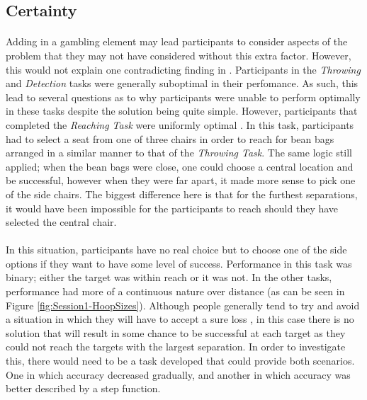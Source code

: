 \documentclass[12pt]{article}
\begin{document}
\subsection*{Certainty}
\paragraph{} Adding in a gambling element may lead participants to consider aspects of the problem that they may not have considered without this extra factor. However, this would not explain one contradicting finding in \cite{clarke2015failure}. Participants in the \textit{Throwing} and \textit{Detection} tasks were generally suboptimal in their perfomance. As such, this lead to several questions as to why participants were unable to perform optimally in these tasks despite the solution being quite simple. However, participants that completed the \textit{Reaching Task} were uniformly optimal \citep{clarke2015failure}. In this task, participants had to select a seat from one of three chairs in order to reach for bean bags arranged in a similar manner to that of the \textit{Throwing Task}. The same logic still applied; when the bean bags were close, one could choose a central location and be successful, however when they were far apart, it made more sense to pick one of the side chairs. The biggest difference here is that for the furthest separations, it would have been impossible for the participants to reach should they have selected the central chair. 

\paragraph{} In this situation, participants have no real choice but to choose one of the side options if they want to have some level of success. Performance in this task was binary; either the target was within reach or it was not. In the other tasks, performance had more of a continuous nature over distance (as can be seen in Figure \ref{fig:Session1-HoopSizes}). Although people generally tend to try and avoid a situation in which they will have to accept a sure loss \cite{KahnemanProspect}, in this case there is no solution that will result in some chance to be successful at each target as they could not reach the targets with the largest separation. In order to investigate this, there would need to be a task developed that could provide both scenarios. One in which accuracy decreased gradually, and another in which accuracy was better described by a step function. 
\end{document}
